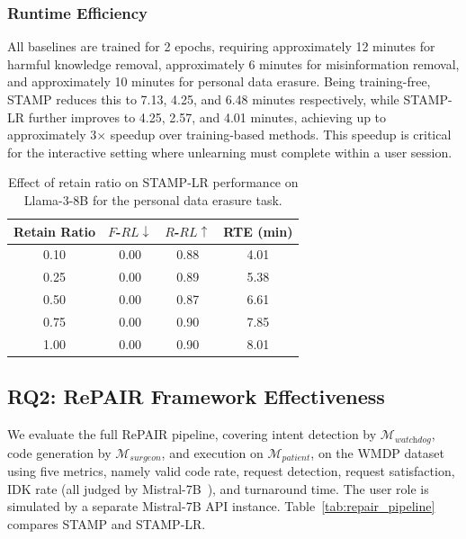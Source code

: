 \subsubsection{Runtime Efficiency}

All baselines are trained for 2 epochs, requiring approximately 12 minutes for harmful knowledge removal, approximately 6 minutes for misinformation removal, and approximately 10 minutes for personal data erasure. Being training-free, STAMP reduces this to 7.13, 4.25, and 6.48 minutes respectively, while STAMP-LR further improves to 4.25, 2.57, and 4.01 minutes, achieving up to approximately 3$\times$ speedup over training-based methods. This speedup is critical for the interactive setting where unlearning must complete within a user session.


\begin{table}[htbp]
\centering
\caption{Effect of retain ratio on STAMP-LR performance on Llama-3-8B for the personal data erasure task.}
\label{tab:retain_ratio}
\small
\renewcommand{\arraystretch}{1.3}
\setlength{\tabcolsep}{8pt}
\begin{tabular}{cccc}
\toprule
\textbf{Retain Ratio} & $F$-$RL\!\downarrow$ & $R$-$RL\!\uparrow$ & \textbf{RTE (min)} \\
\midrule
0.10 & 0.00 & 0.88 & 4.01 \\
\rowcolor{gray!15}
0.25 & 0.00 & 0.89 & 5.38 \\
0.50 & 0.00 & 0.87 & 6.61 \\
\rowcolor{gray!15}
0.75 & 0.00 & 0.90 & 7.85 \\
1.00 & 0.00 & 0.90 & 8.01 \\
\bottomrule
\end{tabular}
\end{table}

\subsection{RQ2: RePAIR Framework Effectiveness}\label{subsec:rp_rq2}

We evaluate the full RePAIR pipeline, covering intent detection by $\mathcal{M}_{\textit{watchdog}}$, code generation by $\mathcal{M}_{\textit{surgeon}}$, and execution on $\mathcal{M}_{\textit{patient}}$, on the WMDP dataset~\citeauthor{li2024wmdp} using five metrics, namely valid code rate, request detection, request satisfaction, IDK rate (all judged by Mistral-7B~\citeauthor{Jiang2023Mistral7}), and turnaround time. The user role is simulated by a separate Mistral-7B API instance. Table~\ref{tab:repair_pipeline} compares STAMP and STAMP-LR.


